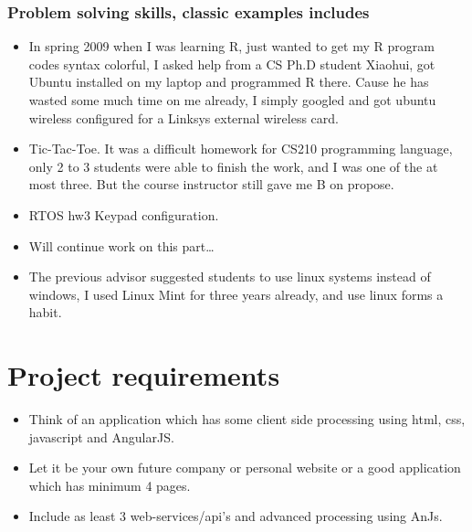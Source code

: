 \documentclass[9pt,b5paper]{article}
\begin{document}
\subsubsection{Problem solving skills, classic examples includes}
\label{sec-8-1-1}
\begin{itemize}
\item In spring 2009 when I was learning R, just wanted to get my R program codes syntax colorful, I asked help from a CS Ph.D student Xiaohui, got Ubuntu installed on my laptop and programmed R there. Cause he has wasted some much time on me already, I simply googled and got ubuntu wireless configured for a Linksys external wireless card.
\item Tic-Tac-Toe. It was a difficult homework for CS210 programming language, only 2 to 3 students were able to finish the work, and I was one of the at most three. But the course instructor still gave me B on propose.
\item RTOS hw3 Keypad configuration.
\item Will continue work on this part\ldots{}
\item The previous advisor suggested students to use linux systems instead of windows, I used Linux Mint for three years already, and use linux forms a habit.
\end{itemize}

\section{Project requirements}
\label{sec-9}
\begin{itemize}
\item Think of an application which has some client side processing using html, css, javascript and AngularJS.
\item Let it be your own future company or personal website or a good application which has minimum 4 pages.
\item Include as least 3 web-services/api's and advanced processing using AnJs.
\end{itemize}
\end{document}
